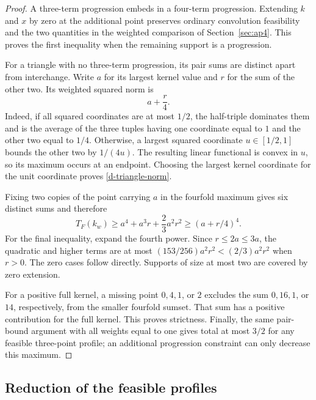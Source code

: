 \begin{proof}
A three-term progression embeds in a four-term progression. Extending $k$
and $x$ by zero at the additional point preserves ordinary convolution
feasibility and the two quantities in the weighted comparison of
Section~\ref{sec:ap4}. This proves the first inequality when the remaining
support is a progression.

For a triangle with no three-term progression, its pair sums are distinct
apart from interchange. Write $a$ for its largest kernel value and $r$ for
the sum of the other two. Its weighted squared norm is
\begin{equation}\label{d-triangle-norm}
a+\frac r4.
\end{equation}
Indeed, if all squared coordinates are at most $1/2$, the half-triple
dominates them and is the average of the three tuples having one coordinate
equal to $1$ and the other two equal to $1/4$. Otherwise, a largest squared
coordinate $u\in[1/2,1]$ bounds the other two by $1/(4u)$. The resulting
linear functional is convex in $u$, so its maximum occurs at an endpoint.
Choosing the largest kernel coordinate for the unit coordinate proves
\eqref{d-triangle-norm}.

Fixing two copies of the point carrying $a$ in the fourfold maximum gives
six distinct sums and therefore
\begin{equation}\label{d-triangle-quartic}
T_F(k_w)
\geq a^4+a^3r+\frac23a^2r^2
\geq(a+r/4)^4.
\end{equation}
For the final inequality, expand the fourth power. Since $r\leq2a\leq3a$,
the quadratic and higher terms are at most
$(153/256)a^2r^2<(2/3)a^2r^2$ when $r>0$. The zero cases follow directly.
Supports of size at most two are covered by zero extension.

For a positive full kernel, a missing point $0,4,1$, or $2$ excludes the
sum $0,16,1$, or $14$, respectively, from the smaller fourfold sumset.
That sum has a positive contribution for the full kernel. This proves
strictness. Finally, the same pair-bound argument with all weights equal
to one gives total at most $3/2$ for any feasible three-point profile;
an additional progression constraint can only decrease this maximum.
\end{proof}

\subsection{Reduction of the feasible profiles}

